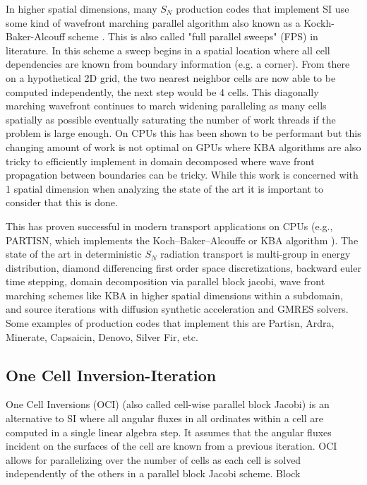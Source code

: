 In higher spatial dimensions, many $S_N$ production codes that implement SI use some kind of wavefront marching parallel algorithm also known as a Kockh-Baker-Alcouff scheme \citep{KBA}.
This is also called "full parallel sweeps" (FPS) in literature.
In this scheme a sweep begins in a spatial location where all cell dependencies are known from boundary information (e.g. a corner).
From there on a hypothetical 2D grid, the two nearest neighbor cells are now able to be computed independently, the next step would be 4 cells.
This diagonally marching wavefront continues to march widening paralleling as many cells spatially as possible eventually saturating the number of work threads if the problem is large enough.
On CPUs this has been shown to be performant but this changing amount of work is not optimal on GPUs where 
KBA algorithms are also tricky to efficiently implement in domain decomposed where wave front propagation between boundaries can be tricky.
While this work is concerned with 1 spatial dimension when analyzing the state of the art it is important to consider that this is done.

This has proven successful in modern transport applications on CPUs 
(e.g., PARTISN, which implements the Koch--Baker--Alcouffe or KBA algorithm ). 
The state of the art in deterministic $S_N$ radiation transport is multi-group in energy distribution, diamond differencing first order space discretizations, backward euler time stepping, domain decomposition via parallel block jacobi, wave front marching schemes like KBA in higher spatial dimensions within a subdomain, and source iterations with diffusion synthetic acceleration and GMRES solvers. Some examples of production codes that implement this are Partisn, Ardra, Minerate, Capsaicin, Denovo, Silver Fir, etc.


\subsection{One Cell Inversion-Iteration}


One Cell Inversions (OCI) (also called cell-wise parallel block Jacobi) is an alternative to SI where all angular fluxes in all ordinates within a cell are computed in a single linear algebra step. It assumes that the angular fluxes incident on the surfaces of the cell are known from a previous iteration.
OCI allows for parallelizing over the number of cells as each cell is solved independently of the others in a parallel block Jacobi scheme. Block

